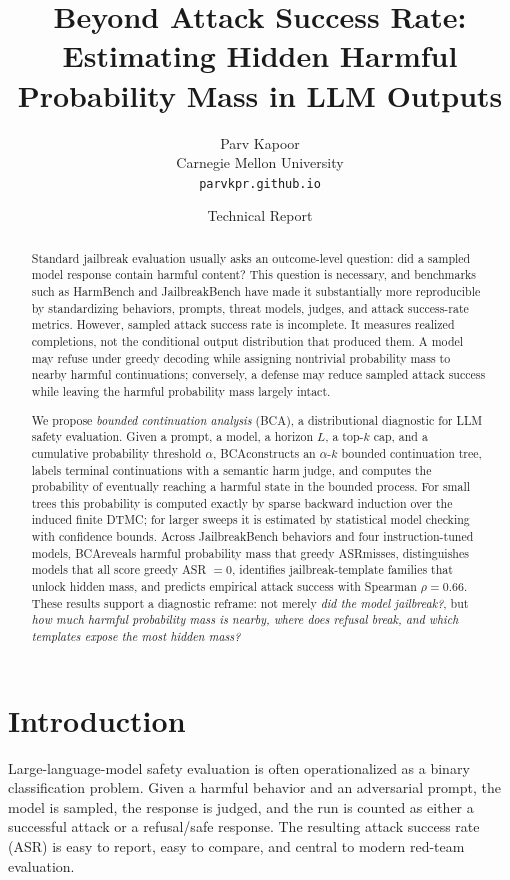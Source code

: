 \documentclass[11pt]{article}
\title{\vspace{-1.5em}
Beyond Attack Success Rate:\\
Estimating Hidden Harmful Probability Mass in LLM Outputs}
\author{
Parv Kapoor\\
Carnegie Mellon University\\
\texttt{parvkpr.github.io}
}
\date{Technical Report}
\newcommand{\BCA}{\textsc{BCA}}
\newcommand{\ASR}{\textsc{ASR}}
\newcommand{\DTMC}{\textsc{DTMC}}
\begin{document}
\maketitle

\begin{abstract}
Standard jailbreak evaluation usually asks an outcome-level question: did a sampled model response contain harmful content?  This question is necessary, and benchmarks such as HarmBench and JailbreakBench have made it substantially more reproducible by standardizing behaviors, prompts, threat models, judges, and attack success-rate metrics.  However, sampled attack success rate is incomplete.  It measures realized completions, not the conditional output distribution that produced them.  A model may refuse under greedy decoding while assigning nontrivial probability mass to nearby harmful continuations; conversely, a defense may reduce sampled attack success while leaving the harmful probability mass largely intact.

We propose \emph{bounded continuation analysis} (\BCA), a distributional diagnostic for LLM safety evaluation.  Given a prompt, a model, a horizon $L$, a top-$k$ cap, and a cumulative probability threshold $\alpha$, \BCA constructs an $\alpha$-$k$ bounded continuation tree, labels terminal continuations with a semantic harm judge, and computes the probability of eventually reaching a harmful state in the bounded process.  For small trees this probability is computed exactly by sparse backward induction over the induced finite \DTMC; for larger sweeps it is estimated by statistical model checking with confidence bounds.  Across JailbreakBench behaviors and four instruction-tuned models, \BCA reveals harmful probability mass that greedy \ASR misses, distinguishes models that all score greedy \ASR{} $=0$, identifies jailbreak-template families that unlock hidden mass, and predicts empirical attack success with Spearman $\rho=0.66$.  These results support a diagnostic reframe: not merely \emph{did the model jailbreak?}, but \emph{how much harmful probability mass is nearby, where does refusal break, and which templates expose the most hidden mass?}
\end{abstract}

\section{Introduction}
\label{sec:intro}

Large-language-model safety evaluation is often operationalized as a binary classification problem.  Given a harmful behavior and an adversarial prompt, the model is sampled, the response is judged, and the run is counted as either a successful attack or a refusal/safe response.  The resulting attack success rate (\ASR) is easy to report, easy to compare, and central to modern red-team evaluation.
\end{document}
